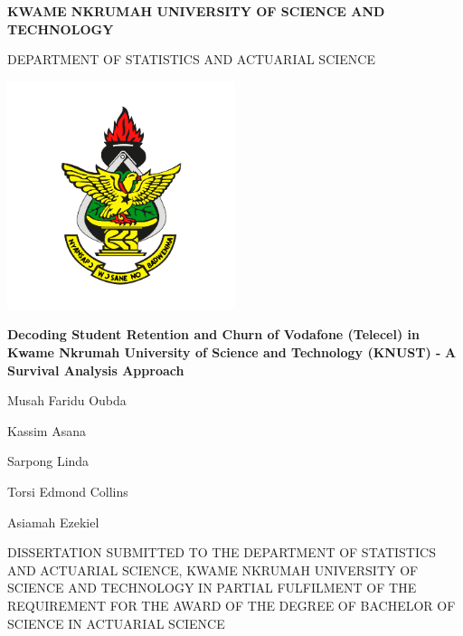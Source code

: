\documentclass[12pt]{report}
\begin{document}
	
	\begin{titlepage}
		\centering
		\vspace{0.2cm}
		\Large\textbf{KWAME NKRUMAH UNIVERSITY OF SCIENCE AND TECHNOLOGY}
		
		\vspace{0.2cm}
		\large{DEPARTMENT OF STATISTICS AND ACTUARIAL SCIENCE}
		\vspace{0.4cm}
		
		\begin{center}
			\includegraphics[width=0.5\textwidth]{logo.png}\end{center}
		
		\large{\textbf{Decoding Student Retention and Churn of
				Vodafone (Telecel) in Kwame Nkrumah University
				of Science and Technology (KNUST) - }}
		\vspace{0.2cm}
		\large{\textbf{A Survival Analysis Approach}}
		\vspace{0.4cm}
		
		\large{Musah Faridu Oubda
			
			Kassim Asana
			
			Sarpong Linda
			
			Torsi Edmond Collins
			
			Asiamah Ezekiel}
		
		\vspace{0.8cm}  
		\small{DISSERTATION SUBMITTED TO THE DEPARTMENT OF STATISTICS AND ACTUARIAL SCIENCE, KWAME NKRUMAH UNIVERSITY OF SCIENCE AND TECHNOLOGY IN PARTIAL FULFILMENT OF THE REQUIREMENT FOR THE AWARD OF THE DEGREE OF BACHELOR OF SCIENCE IN ACTUARIAL SCIENCE}\\
		
		
	\end{titlepage}
	
\end{document}
